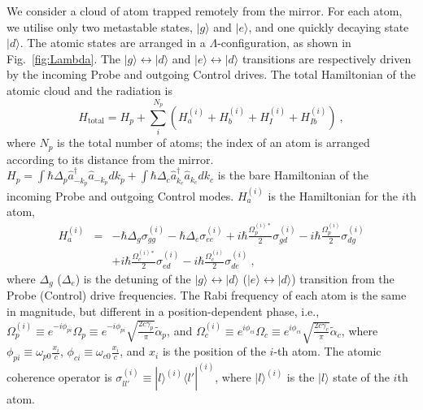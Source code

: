 \documentclass[aps, pra, reprint, amsmath, amssymb, groupedaddress, acknowledgments]{revtex4-1}
\begin{document}
We consider a cloud of atom trapped remotely from the mirror.  For each atom, we utilise only two metastable states, $|g\rangle$ and $|e\rangle$, and one quickly decaying state $|d\rangle$.  The atomic states are arranged in a $\Lambda$-configuration, as shown in Fig.~\ref{fig:Lambda}.  The $|g\rangle \leftrightarrow |d\rangle$ and $|e\rangle \leftrightarrow |d\rangle$ transitions are respectively driven by the incoming Probe and outgoing Control drives.  The total Hamiltonian of the atomic cloud and the radiation is 
\begin{equation}
H_\textrm{total} = H_{p} + \sum_{i}^{N_p} (H_{a}^{(i)} + H_{b}^{(i)} + H_{I}^{(i)} + H_{Ib}^{(i)})~,
\end{equation}
where $N_p$ is the total number of atoms; the index of an atom is arranged according to its distance from the mirror. $H_{p} = \int \hbar \Delta_p \hat{a}^\dag_{-k_p}\hat{a}_{-k_p} dk_p + \int \hbar \Delta_c \hat{a}^\dag_{k_c}\hat{a}_{k_c} dk_c$ is the bare Hamiltonian of the incoming Probe and outgoing Control modes.  $H_{a}^{(i)}$ is the Hamiltonian for the $i$th atom,
\begin{eqnarray}
H_a^{(i)} &=& -\hbar \Delta_g \sigma_{gg}^{(i)} -\hbar \Delta_e \sigma_{ee}^{(i)} + i \hbar\frac{\Omega_p^{(i)\ast}}{2} \sigma_{gd}^{(i)} -  i \hbar\frac{\Omega_p^{(i)}}{2} \sigma_{dg}^{(i)} \nonumber \\
&&+ i \hbar\frac{\Omega_c^{(i)\ast}}{2} \sigma_{ed}^{(i)} -  i \hbar\frac{\Omega_c^{(i)}}{2} \sigma_{de}^{(i)} ~,\label{eq:Ha}
\end{eqnarray}
where $\Delta_g$ ($\Delta_e$) is the detuning of the $|g\rangle \leftrightarrow |d\rangle$ ($|e\rangle \leftrightarrow |d\rangle$) transition from the Probe (Control) drive frequencies.  The Rabi frequency of each atom is the same in magnitude, but different in a position-dependent phase, i.e., $\Omega_p^{(i)} \equiv e^{-i \phi_{pi}} \Omega_p\equiv e^{-i \phi_{pi}} \sqrt{\frac{2c\gamma_p}{\pi}} \tilde{\alpha}_p$, and $\Omega_c^{(i)} \equiv e^{i \phi_{ci}} \Omega_c \equiv e^{i \phi_{ci}} \sqrt{\frac{2c\gamma_c}{\pi}} \tilde{\alpha}_c$, where $\phi_{pi}\equiv \omega_{p0}\frac{x_i}{c}$, $\phi_{ci}\equiv \omega_{c0}\frac{x_i}{c}$, and $x_i$ is the position of the $i$-th atom.  The atomic coherence operator is $\sigma_{ll'}^{(i)}\equiv |l\rangle^{(i)} \langle l'|^{(i)}$, where $|l\rangle^{(i)}$ is the $|l\rangle$ state of the $i$th atom.  
\end{document}

